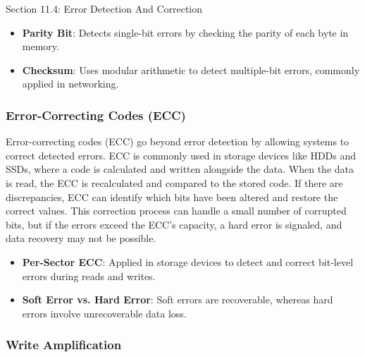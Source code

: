 \begin{notes}{Section 11.4: Error Detection And Correction}
    \begin{highlight}
    
        \begin{itemize}
            \item \textbf{Parity Bit}: Detects single-bit errors by checking the parity of each byte in memory.
            \item \textbf{Checksum}: Uses modular arithmetic to detect multiple-bit errors, commonly applied in networking.
        \end{itemize}
    
    \end{highlight}
    
    \subsubsection*{Error-Correcting Codes (ECC)}
    
    Error-correcting codes (ECC) go beyond error detection by allowing systems to correct detected errors. ECC is commonly used in storage devices like HDDs and SSDs, where a code is calculated 
    and written alongside the data. When the data is read, the ECC is recalculated and compared to the stored code. If there are discrepancies, ECC can identify which bits have been altered and 
    restore the correct values. This correction process can handle a small number of corrupted bits, but if the errors exceed the ECC’s capacity, a hard error is signaled, and data recovery may not 
    be possible.
    
    \begin{highlight}
    
        \begin{itemize}
            \item \textbf{Per-Sector ECC}: Applied in storage devices to detect and correct bit-level errors during reads and writes.
            \item \textbf{Soft Error vs. Hard Error}: Soft errors are recoverable, whereas hard errors involve unrecoverable data loss.
        \end{itemize}
    
    \end{highlight}
    
    \subsubsection*{Write Amplification}
    

\end{notes}
